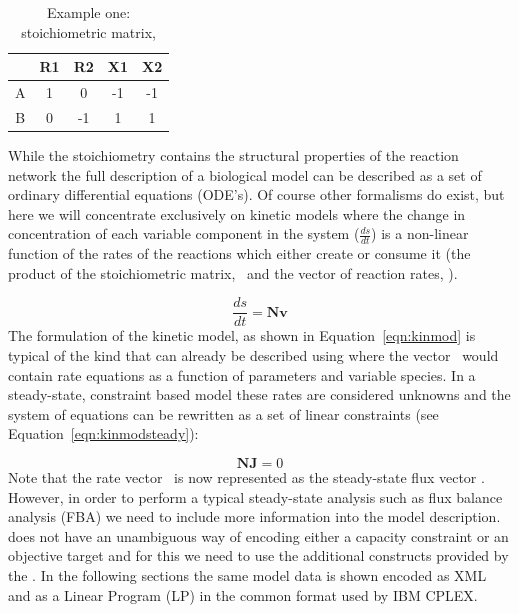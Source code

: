 \begin{table}[h]
  \centering
    \begin{tabular}{c|cccc}
          & R1 & R2 & X1 & X2 \\ \hline
        A & 1 &  0 & -1 & -1 \\
        B & 0 & -1 &  1 &  1 \\
    \end{tabular}
  \caption{Example one: stoichiometric matrix, \Nmat}
  \label{tble:ex1nmat}
\end{table}
%
While the stoichiometry contains the structural properties of the
reaction network the full description of a biological model can be
described as a set of ordinary differential equations (ODE's). Of course
other formalisms do exist, but here we will concentrate exclusively on
kinetic models where the change in concentration of each variable
component in the system ($\frac{ds}{dt}$) is a non-linear function of
the rates of the reactions which either create or consume it (the
product of the stoichiometric matrix, \Nmat\ and the vector of reaction
rates, \vvec).


%
\begin{equation}\label{eqn:kinmod}
  \frac{ds}{dt} = \textbf{Nv}
\end{equation}
%
The formulation of the kinetic model, as shown in
Equation~\ref{eqn:kinmod} is typical of the kind that can already be
described using \sbmlthreecore where the vector \vvec\ would contain
rate equations as a function of parameters and variable species. In a
steady-state, constraint based model these rates are considered unknowns
and the system of equations can be rewritten as a set of linear
constraints (see Equation~\ref{eqn:kinmodsteady}):


%
\begin{equation}\label{eqn:kinmodsteady}
  \textbf{NJ} = 0
\end{equation}
%
Note that the rate vector \vvec\ is now represented as the steady-state
flux vector \Jvec. However, in order to perform a typical steady-state
analysis such as flux balance analysis (FBA) we need to include more
information into the model description. \sbmlthreecore does not have an
unambiguous way of encoding either a capacity constraint or an objective
target and for this we need to use the additional constructs provided by
the \FBCPackage. In the following sections the same model data is shown
encoded as XML and as a Linear Program (LP) in the common format used by
IBM \textsf{CPLEX}.


